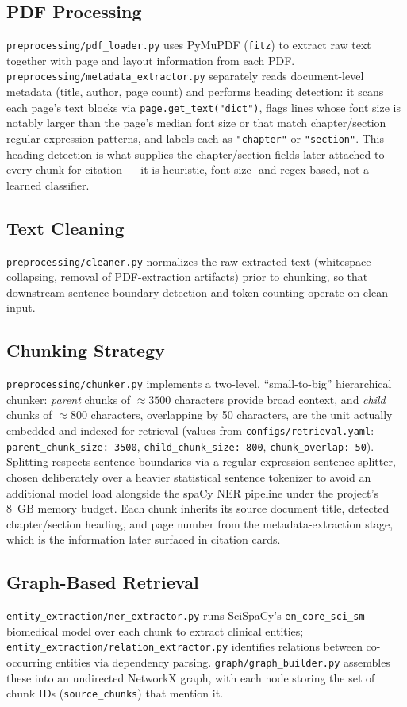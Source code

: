 \documentclass[conference]{IEEEtran}
\begin{document}
\subsection{PDF Processing}
\texttt{preprocessing/pdf\_loader.py} uses PyMuPDF (\texttt{fitz}) to extract raw text together with page and layout information from each PDF. \texttt{preprocessing/metadata\_extractor.py} separately reads document-level metadata (title, author, page count) and performs heading detection: it scans each page's text blocks via \texttt{page.get\_text("dict")}, flags lines whose font size is notably larger than the page's median font size or that match chapter/section regular-expression patterns, and labels each as \texttt{"chapter"} or \texttt{"section"}. This heading detection is what supplies the chapter/section fields later attached to every chunk for citation — it is heuristic, font-size- and regex-based, not a learned classifier.

\subsection{Text Cleaning}
\texttt{preprocessing/cleaner.py} normalizes the raw extracted text (whitespace collapsing, removal of PDF-extraction artifacts) prior to chunking, so that downstream sentence-boundary detection and token counting operate on clean input.

\subsection{Chunking Strategy}
\texttt{preprocessing/chunker.py} implements a two-level, ``small-to-big'' hierarchical chunker: \emph{parent} chunks of $\approx 3500$ characters provide broad context, and \emph{child} chunks of $\approx 800$ characters, overlapping by 50 characters, are the unit actually embedded and indexed for retrieval (values from \texttt{configs/retrieval.yaml}: \texttt{parent\_chunk\_size: 3500}, \texttt{child\_chunk\_size: 800}, \texttt{chunk\_overlap: 50}). Splitting respects sentence boundaries via a regular-expression sentence splitter, chosen deliberately over a heavier statistical sentence tokenizer to avoid an additional model load alongside the spaCy NER pipeline under the project's 8~GB memory budget. Each chunk inherits its source document title, detected chapter/section heading, and page number from the metadata-extraction stage, which is the information later surfaced in citation cards.

\subsection{Graph-Based Retrieval}
\label{sec:graph}
\texttt{entity\_extraction/ner\_extractor.py} runs SciSpaCy's \texttt{en\_core\_sci\_sm} biomedical model over each chunk to extract clinical entities; \texttt{entity\_extraction/relation\_extractor.py} identifies relations between co-occurring entities via dependency parsing. \texttt{graph/graph\_builder.py} assembles these into an undirected NetworkX graph, with each node storing the set of chunk IDs (\texttt{source\_chunks}) that mention it.
\end{document}
